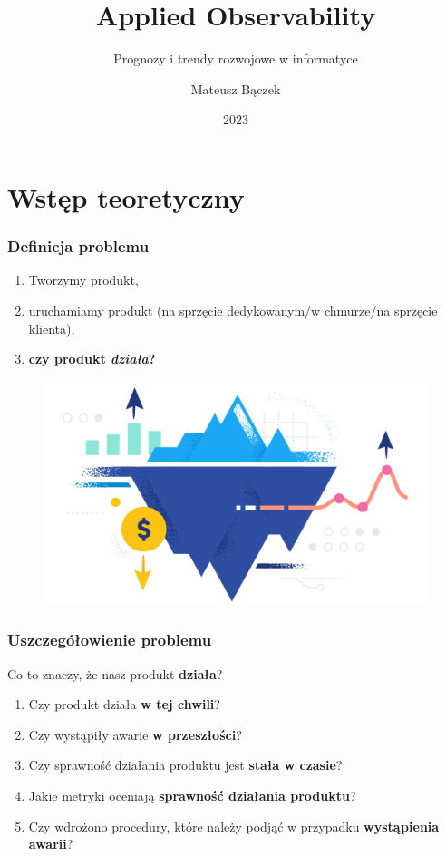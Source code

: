 \documentclass[]{beamer}
\title{Applied Observability}
\subtitle{Prognozy i trendy rozwojowe w informatyce}
\author{Mateusz Bączek}
\institute{Politechnika Wrocławska}
\date{2023}
\begin{document}
\frame{\titlepage}

\section{Wstęp teoretyczny}

\begin{frame}
\frametitle{Definicja problemu}
\begin{multicols}{2}
  \begin{enumerate}
    \item Tworzymy produkt,
    \item uruchamiamy produkt (na sprzęcie dedykowanym/w chmurze/na sprzęcie klienta),
    \item \textbf{czy produkt \textit{działa}?}
  \end{enumerate}

  \begin{figure}
    \centering
    \includegraphics[width=0.8\linewidth]{elastic_search_banner.png}
  \end{figure}
\end{multicols}

\end{frame}

\begin{frame}
\frametitle{Uszczegółowienie problemu}
\vspace{-1cm}

Co to znaczy, że nasz produkt \textbf{działa}?

\begin{enumerate}
  \item Czy produkt działa \textbf{w tej chwili}?
  \item Czy wystąpiły awarie \textbf{w przeszłości}?
  \item Czy sprawność działania produktu jest \textbf{stała w czasie}?
  \item Jakie metryki oceniają \textbf{sprawność działania produktu}?
  \item Czy wdrożono procedury, które należy podjąć w przypadku \textbf{wystąpienia awarii}?
\end{enumerate}
\end{frame}
\end{document}
